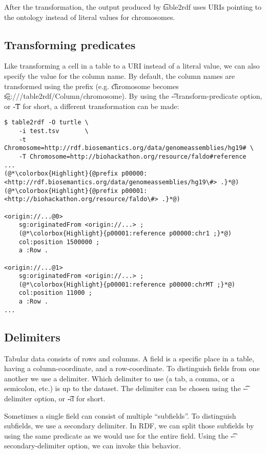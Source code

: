   After the transformation, the output produced by \t{table2rdf} uses
  URIs pointing to the ontology instead of literal values for chromosomes.

\subsection{Transforming predicates}

  Like transforming a cell in a table to a URI instead of a literal value,
  we can also specify the value for the column name.  By default, the column
  names are transformed using the  prefix (e.g.
  \t{chromosome} becomes
  \t{sg://\sgversion{}/table2rdf/Column/chromosome}).  By using
  the \t{-{}-transform-predicate} option, or \t{-T} for short, a
  different transformation can be made:

\begin{siderules}
\begin{lstlisting}
$ table2rdf -O turtle \
    -i test.tsv       \
    -t Chromosome=http://rdf.biosemantics.org/data/genomeassemblies/hg19# \
    -T Chromosome=http://biohackathon.org/resource/faldo#reference
...
(@*\colorbox{Highlight}{@prefix p00000: <http://rdf.biosemantics.org/data/genomeassemblies/hg19\#> .}*@)
(@*\colorbox{Highlight}{@prefix p00001: <http://biohackathon.org/resource/faldo\#> .}*@)

<origin://...@0>
    sg:originatedFrom <origin://...> ;
    (@*\colorbox{Highlight}{p00001:reference p00000:chr1 ;}*@)
    col:position 1500000 ;
    a :Row .

<origin://...@1>
    sg:originatedFrom <origin://...> ;
    (@*\colorbox{Highlight}{p00001:reference p00000:chrMT ;}*@)
    col:position 11000 ;
    a :Row .
...
\end{lstlisting}
\end{siderules}

\subsection{Delimiters}

  Tabular data consists of rows and columns.  A field is a specific place in
  a table, having a column-coordinate, and a row-coordinate.  To distinguish
  fields from one another we use a delimiter.  Which delimiter to use (a tab,
  a comma, or a semicolon, etc.) is up to the dataset.  The delimiter
  can be chosen using the \t{-{}-delimiter} option, or \t{-d} for
  short.

  Sometimes a single field can consist of multiple ``subfields''.  To
  distinguish subfields, we use a secondary delimiter.  In RDF, we can split
  those subfields by using the same predicate as we would use for the entire
  field.  Using the \t{-{}-secondary-delimiter} option, we can invoke
  this behavior.

